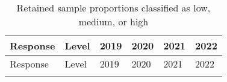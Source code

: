 \documentclass[
  single column]{article}
\begin{document}
\begin{longtable}[]{@{}
  >{\raggedright\arraybackslash}p{}
  >{\raggedright\arraybackslash}p{}
  >{\raggedright\arraybackslash}p{}
  >{\raggedright\arraybackslash}p{}
  >{\raggedright\arraybackslash}p{}
  >{\raggedright\arraybackslash}p{}@{}}
\caption{Retained sample proportions classified as low, medium, or
high}\label{tbl-sample-cat}\tabularnewline
\toprule\noalign{}
\begin{minipage}[b]{\linewidth}\raggedright
Response
\end{minipage} & \begin{minipage}[b]{\linewidth}\raggedright
Level
\end{minipage} & \begin{minipage}[b]{\linewidth}\raggedright
2019
\end{minipage} & \begin{minipage}[b]{\linewidth}\raggedright
2020
\end{minipage} & \begin{minipage}[b]{\linewidth}\raggedright
2021
\end{minipage} & \begin{minipage}[b]{\linewidth}\raggedright
2022
\end{minipage} \\
\midrule\noalign{}
\endfirsthead
\toprule\noalign{}
\begin{minipage}[b]{\linewidth}\raggedright
Response
\end{minipage} & \begin{minipage}[b]{\linewidth}\raggedright
Level
\end{minipage} & \begin{minipage}[b]{\linewidth}\raggedright
2019
\end{minipage} & \begin{minipage}[b]{\linewidth}\raggedright
2020
\end{minipage} & \begin{minipage}[b]{\linewidth}\raggedright
2021
\end{minipage} & \begin{minipage}[b]{\linewidth}\raggedright
2022
\end{minipage} \\
\midrule\noalign{}
\endhead
\bottomrule\noalign{}

\end{longtable}
\end{document}
